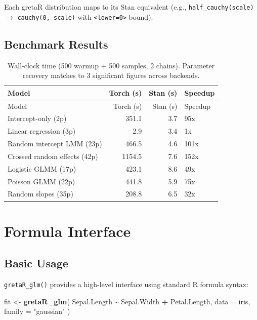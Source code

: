\documentclass[
  11pt,
]{article}
\newenvironment{Shaded}{\begin{snugshade}}{\end{snugshade}}
\newcommand{\AttributeTok}[1]{\textcolor[rgb]{0.13,0.29,0.53}{#1}}
\newcommand{\FunctionTok}[1]{\textcolor[rgb]{0.13,0.29,0.53}{\textbf{#1}}}
\newcommand{\NormalTok}[1]{#1}
\newcommand{\OtherTok}[1]{\textcolor[rgb]{0.56,0.35,0.01}{#1}}
\newcommand{\SpecialCharTok}[1]{\textcolor[rgb]{0.81,0.36,0.00}{\textbf{#1}}}
\newcommand{\StringTok}[1]{\textcolor[rgb]{0.31,0.60,0.02}{#1}}
\begin{document}
Each gretaR distribution maps to its Stan equivalent (e.g.,
\texttt{half\_cauchy(scale)} \(\to\) \texttt{cauchy(0,\ scale)} with
\texttt{\textless{}lower=0\textgreater{}} bound).

\subsection{Benchmark Results}\label{benchmark-results}

\begin{longtable}[]{@{}lrrl@{}}
\caption{Wall-clock time (500 warmup + 500 samples, 2 chains). Parameter
recovery matches to 3 significant figures across
backends.}\tabularnewline
\toprule\noalign{}
Model & Torch (s) & Stan (s) & Speedup \\
\midrule\noalign{}
\endfirsthead
\toprule\noalign{}
Model & Torch (s) & Stan (s) & Speedup \\
\midrule\noalign{}
\endhead
\bottomrule\noalign{}
\endlastfoot
Intercept-only (2p) & 351.1 & 3.7 & 95x \\
Linear regression (3p) & 2.9 & 3.4 & 1x \\
Random intercept LMM (23p) & 466.5 & 4.6 & 101x \\
Crossed random effects (42p) & 1154.5 & 7.6 & 152x \\
Logistic GLMM (17p) & 423.1 & 8.6 & 49x \\
Poisson GLMM (22p) & 441.8 & 5.9 & 75x \\
Random slopes (35p) & 208.8 & 6.5 & 32x \\
\end{longtable}

\section{Formula Interface}\label{formula-interface}

\subsection{Basic Usage}\label{basic-usage}

\texttt{gretaR\_glm()} provides a high-level interface using standard R
formula syntax:

\begin{Shaded}
\begin{Highlighting}[]
\NormalTok{fit }\OtherTok{\textless{}{-}} \FunctionTok{gretaR\_glm}\NormalTok{(}
\NormalTok{  Sepal.Length }\SpecialCharTok{\textasciitilde{}}\NormalTok{ Sepal.Width }\SpecialCharTok{+}\NormalTok{ Petal.Length,}
  \AttributeTok{data =}\NormalTok{ iris,}
  \AttributeTok{family =} \StringTok{"gaussian"}
\NormalTok{)}
\end{Highlighting}
\end{Shaded}
\end{document}
